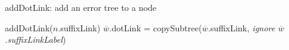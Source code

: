 \begin{algorithm}
\caption{addDotLink: add an error tree to a node}\label{algo:addDotLink}
addDotLink($n$.suffixLink)\;
$\overline{w}$.dotLink = copySubtree($\overline{w}$.suffixLink, \emph{ignore $\overline{w}$.suffixLinkLabel})\;
\end{algorithm}
